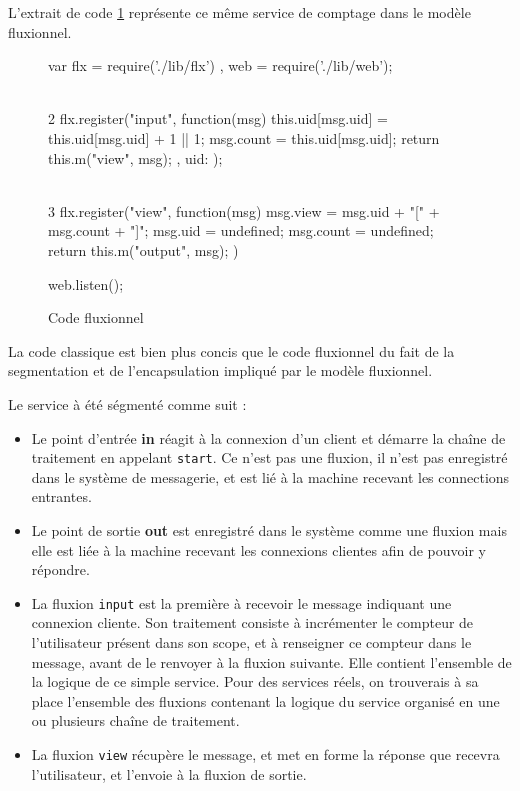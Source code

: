L'extrait de code \ref{lst:fluxionnel} représente ce même service de comptage dans le modèle fluxionnel.

\begin{figure}
  \begin{code}
  var flx = require('./lib/flx')
    , web = require('./lib/web');

  \\ 2
  flx.register("input", function(msg){
    this.uid[msg.uid] = this.uid[msg.uid] + 1 || 1;
    msg.count = this.uid[msg.uid];
    return this.m("view", msg);
  },{
    uid: {}
  });

  \\ 3
  flx.register("view", function(msg) {
    msg.view = msg.uid + "[" + msg.count + "]";
    msg.uid = undefined;
    msg.count = undefined;
    return this.m("output", msg);
  })

  web.listen();
  \end{code}
  \caption{Code fluxionnel}
  \label{lst:fluxionnel}
\end{figure}

La code classique est bien plus concis que le code fluxionnel du fait de la segmentation et de l'encapsulation impliqué par le modèle fluxionnel.

Le service à été ségmenté comme suit :
\begin{itemize}
  \item[\circled{1}] Le point d'entrée \textbf{in} réagit à la connexion d'un client et démarre la chaîne de traitement en appelant \texttt{start}.
  Ce n'est pas une fluxion, il n'est pas enregistré dans le système de messagerie, et est lié à la machine recevant les connections entrantes.
  \item[\circled{4}] Le point de sortie \textbf{out} est enregistré dans le système comme une fluxion mais elle est liée à la machine recevant les connexions clientes afin de pouvoir y répondre.
  \item[\circled{2}] La fluxion \texttt{input} est la première à recevoir le message indiquant une connexion cliente. Son traitement consiste à incrémenter le compteur de l'utilisateur présent dans son scope, et à renseigner ce compteur dans le message, avant de le renvoyer à la fluxion suivante.
  Elle contient l'ensemble de la logique de ce simple service. Pour des services réels, on trouverais à sa place l'ensemble des fluxions contenant la logique du service organisé en une ou plusieurs chaîne de traitement.
  \item[\circled{3}] La fluxion \texttt{view} récupère le message, et met en forme la réponse que recevra l'utilisateur, et l'envoie à la fluxion de sortie.
\end{itemize}

